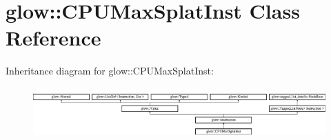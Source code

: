 \hypertarget{classglow_1_1_c_p_u_max_splat_inst}{}\section{glow\+:\+:C\+P\+U\+Max\+Splat\+Inst Class Reference}
\label{classglow_1_1_c_p_u_max_splat_inst}
Inheritance diagram for glow\+:\+:C\+P\+U\+Max\+Splat\+Inst\+:\begin{figure}[H]
\begin{center}
\leavevmode
\includegraphics[height=1.991111cm]{classglow_1_1_c_p_u_max_splat_inst}
\end{center}
\end{figure}
